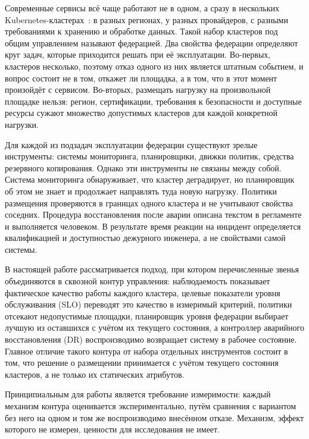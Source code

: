 
Современные сервисы всё чаще работают не в одном, а сразу в нескольких
Kubernetes-кластерах~\cite{k8s}: в разных регионах, у разных провайдеров, с
разными требованиями к хранению и обработке данных. Такой набор кластеров под
общим управлением называют федерацией. Два свойства федерации определяют
круг задач, которые приходится решать при её эксплуатации. Во-первых,
кластеров несколько, поэтому отказ одного из них является штатным событием, и
вопрос состоит не в том, откажет ли площадка, а в том, что в этот момент
произойдёт с сервисом. Во-вторых, размещать нагрузку на произвольной площадке
нельзя: регион, сертификации, требования к безопасности и доступные ресурсы
сужают множество допустимых кластеров для каждой конкретной нагрузки.

Для каждой из подзадач эксплуатации федерации существуют зрелые инструменты:
системы мониторинга, планировщики, движки политик, средства резервного
копирования. Однако эти инструменты не связаны между собой. Система
мониторинга обнаруживает, что кластер деградирует, но планировщик об этом не
знает и продолжает направлять туда новую нагрузку. Политики размещения
проверяются в границах одного кластера и не учитывают свойства соседних.
Процедура восстановления после аварии описана текстом в регламенте и
выполняется человеком. В результате время реакции на инцидент определяется
квалификацией и доступностью дежурного инженера, а не свойствами самой
системы.

В настоящей работе рассматривается подход, при котором перечисленные
звенья объединяются в сквозной контур управления: наблюдаемость показывает
фактическое качество работы каждого кластера, целевые показатели уровня
обслуживания (SLO) переводят это качество в измеримый критерий, политики
отсекают недопустимые площадки, планировщик уровня федерации выбирает
лучшую из оставшихся с учётом их текущего состояния, а контроллер
аварийного восстановления (DR) воспроизводимо возвращает систему в рабочее
состояние. Главное отличие такого контура от набора отдельных инструментов
состоит в том, что решение о размещении принимается с учётом текущего
состояния кластеров, а не только их статических атрибутов.

Принципиальным для работы является требование измеримости: каждый механизм
контура оценивается экспериментально, путём сравнения с вариантом без него на
одном и том же воспроизводимо внесённом отказе. Механизм, эффект которого не
измерен, ценности для исследования не имеет.


